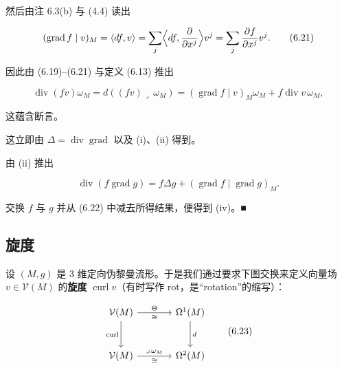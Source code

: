 \begin{proposition}
\begin{subitems}
然后由注 6.3(b) 与 (4.4) 读出

\begin{equation}
(\operatorname{grad} f\mid v)_M = \langle df, v\rangle = \sum_{j}\Bigl\langle df, \frac{\partial}{\partial x^{j}}\Bigr\rangle v^{j} = \sum_{j}\frac{\partial f}{\partial x^{j}}v^{j}.\tag{6.21}
\end{equation}

因此由 (6.19)–(6.21) 与定义 (6.13) 推出

\[
\operatorname{div}(fv)\omega_{M} = d((fv)\lrcorner\,\omega_{M}) = (\operatorname{grad} f\mid v)_M\omega_{M} + f\operatorname{div} v\,\omega_{M},
\]

这蕴含断言。

\item[（iii）]

这立即由 $ \Delta = \operatorname{div}\operatorname{grad} $ 以及 (i)、(ii) 得到。

\item[（iv）]

由 (ii) 推出

\begin{equation}
\operatorname{div}(f\operatorname{grad} g) = f\Delta g + (\operatorname{grad} f\mid\operatorname{grad} g)_M.\tag{6.22}
\end{equation}

交换 $ f $ 与 $ g $ 并从 (6.22) 中减去所得结果，便得到 (iv)。\nobreak\hspace{0.35em}■

\end{subitems}

\end{proposition}

\subsection*{旋度}

设 $ (M, g) $ 是 3 维定向伪黎曼流形。于是我们通过要求下图交换来定义向量场 $ v \in \mathcal{V}(M) $ 的\textbf{旋度} $ \operatorname{curl} v $（有时写作 rot，是“rotation”的缩写）：

\[
\begin{tikzcd}[row sep=large, column sep=large] \mathcal{V}(M) \arrow[r, "\Theta", "\cong"'] \arrow[d, "\operatorname{curl}"'] & \Omega^{1}(M) \arrow[d, "d"] \\ \mathcal{V}(M) \arrow[r, "\lrcorner\,\omega_{M}", "\cong"'] & \Omega^{2}(M) \end{tikzcd} \tag{6.23}
\]

